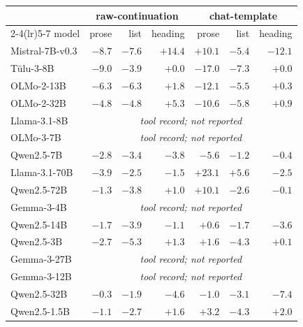 \begin{center}\scriptsize\setlength{\tabcolsep}{4.2pt}
\begin{tabular}{l rrr @{\hspace{1.0em}} rrr}\toprule
& \multicolumn{3}{c}{raw-continuation} & \multicolumn{3}{c}{chat-template} \\
\cmidrule(lr){2-4}\cmidrule(lr){5-7}
model & prose & list & heading & prose & list & heading \\ \midrule
Mistral-7B-v0.3 & \textbf{$-8.7$} & \textbf{$-7.6$} & $+14.4$ & \textbf{$+10.1$} & \textbf{$-5.4$} & \textbf{$-12.1$} \\
T\"ulu-3-8B & \textbf{$-9.0$} & \textbf{$-3.9$} & $+0.0$ & \textbf{$-17.0$} & \textbf{$-7.3$} & $+0.0$ \\
OLMo-2-13B & \textbf{$-6.3$} & \textbf{$-6.3$} & $+1.8$ & \textbf{$-12.1$} & \textbf{$-5.5$} & \textbf{$+0.3$} \\
OLMo-2-32B & \textbf{$-4.8$} & \textbf{$-4.8$} & $+5.3$ & \textbf{$-10.6$} & \textbf{$-5.8$} & \textbf{$+0.9$} \\
Llama-3.1-8B & \multicolumn{6}{c}{\emph{tool record; not reported}} \\
OLMo-3-7B & \multicolumn{6}{c}{\emph{tool record; not reported}} \\
Qwen2.5-7B & \textbf{$-2.8$} & \textbf{$-3.4$} & $-3.8$ & \textbf{$-5.6$} & \textbf{$-1.2$} & $-0.4$ \\
Llama-3.1-70B & \textbf{$-3.9$} & \textbf{$-2.5$} & $-1.5$ & \textbf{$+23.1$} & \textbf{$+5.6$} & \textbf{$-2.5$} \\
Qwen2.5-72B & $-1.3$ & \textbf{$-3.8$} & \textbf{$+1.0$} & \textbf{$+10.1$} & \textbf{$-2.6$} & $-0.1$ \\
Gemma-3-4B & \multicolumn{6}{c}{\emph{tool record; not reported}} \\
Qwen2.5-14B & \textbf{$-1.7$} & \textbf{$-3.9$} & $-1.1$ & $+0.6$ & \textbf{$-1.7$} & $-3.6$ \\
Qwen2.5-3B & \textbf{$-2.7$} & \textbf{$-5.3$} & \textbf{$+1.3$} & \textbf{$+1.6$} & \textbf{$-4.3$} & $+0.1$ \\
Gemma-3-27B & \multicolumn{6}{c}{\emph{tool record; not reported}} \\
Gemma-3-12B & \multicolumn{6}{c}{\emph{tool record; not reported}} \\
Qwen2.5-32B & $-0.3$ & $-1.9$ & $-4.6$ & $-1.0$ & \textbf{$-3.1$} & \textbf{$-7.4$} \\
Qwen2.5-1.5B & $-1.1$ & \textbf{$-2.7$} & \textbf{$+1.6$} & \textbf{$+3.2$} & \textbf{$-4.3$} & \textbf{$+2.0$} \\
\bottomrule\end{tabular}\end{center}
